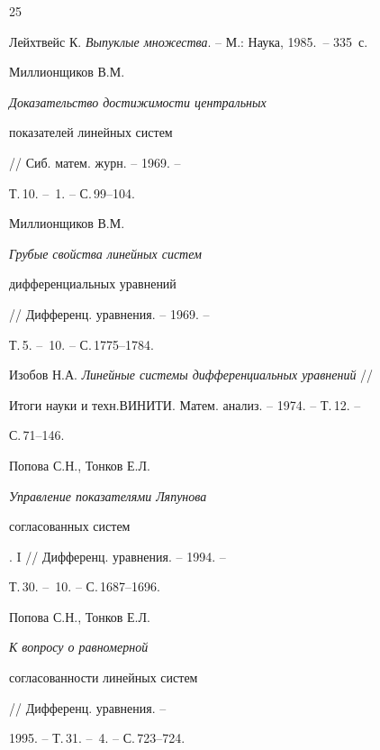 \begin{thebibliography}{25}







Лейхтвейс К. {\em Выпуклые множества}. -- М.: Наука, 1985.~-- 335~с.







Миллионщиков В.М. {\em Доказательство достижимости центральных


показателей линейных систем} // Сиб. матем. журн. -- 1969. --


Т.\,10. -- \No\,1. -- С.\,99--104.







Миллионщиков В.М. {\em Грубые свойства линейных систем


дифференциальных уравнений} // Дифференц. уравнения. -- 1969. --


Т.\,5. -- \No\,10. -- С.\,1775--1784.







Изобов Н.А. {\em Линейные системы дифференциальных уравнений} //


Итоги науки и техн.\linebreak ВИНИТИ. Матем. анализ. -- 1974. -- Т.\,12. --


С.\,71--146.







Попова С.Н., Тонков Е.Л. {\em Управление показателями Ляпунова


согласованных систем}. I // Дифференц.  уравнения. -- 1994. --


Т.\,30. -- \No\,10. -- С.\,1687--1696.







Попова С.Н., Тонков Е.Л. {\em К вопросу о равномерной


согласованности линейных систем} // Дифференц. уравнения. --


1995. -- Т.\,31. -- \No\,4. -- С.\,723--724.






\end{thebibliography}

